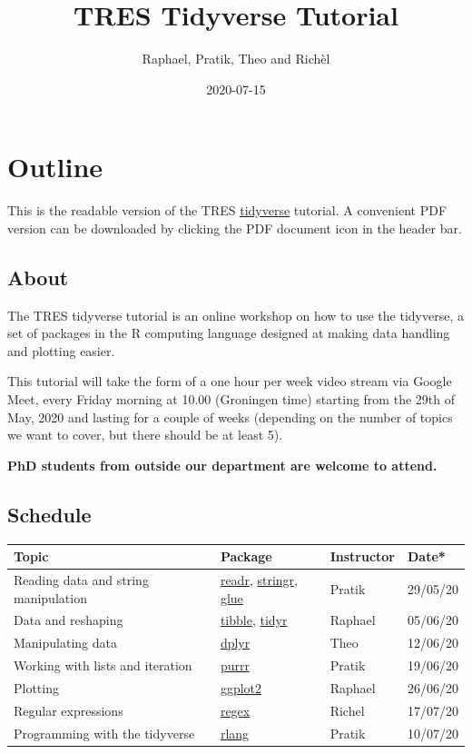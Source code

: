 \documentclass[]{book}
\title{TRES Tidyverse Tutorial}
\author{Raphael, Pratik, Theo and Richèl}
\date{2020-07-15}
\begin{document}
\maketitle


\linenumbers

{
\setcounter{tocdepth}{1}
\tableofcontents
}
\hypertarget{outline}{%
\chapter*{Outline}\label{outline}}

This is the readable version of the TRES \href{https://www.tidyverse.org/}{tidyverse} tutorial. A convenient PDF version can be downloaded by clicking the PDF document icon in the header bar.

\hypertarget{about}{%
\section*{About}\label{about}}

The TRES tidyverse tutorial is an online workshop on how to use the tidyverse, a set of packages in the R computing language designed at making data handling and plotting easier.

This tutorial will take the form of a one hour per week video stream via Google Meet, every Friday morning at 10.00 (Groningen time) starting from the 29th of May, 2020 and lasting for a couple of weeks (depending on the number of topics we want to cover, but there should be at least 5).

\textbf{PhD students from outside our department are welcome to attend.}

\hypertarget{schedule}{%
\section*{Schedule}\label{schedule}}

\begin{longtable}[]{@{}llll@{}}
\toprule
Topic & Package & Instructor & Date*\tabularnewline
\midrule
\endhead
Reading data and string manipulation & \href{https://readr.tidyverse.org/}{readr}, \href{https://stringr.tidyverse.org/}{stringr}, \href{https://github.com/tidyverse/glue}{glue} & Pratik & 29/05/20\tabularnewline
Data and reshaping & \href{https://tibble.tidyverse.org/}{tibble}, \href{https://tidyr.tidyverse.org/}{tidyr} & Raphael & 05/06/20\tabularnewline
Manipulating data & \href{https://dplyr.tidyverse.org/}{dplyr} & Theo & 12/06/20\tabularnewline
Working with lists and iteration & \href{https://purrr.tidyverse.org/}{purrr} & Pratik & 19/06/20\tabularnewline
Plotting & \href{https://ggplot2.tidyverse.org/}{ggplot2} & Raphael & 26/06/20\tabularnewline
Regular expressions & \href{https://stat.ethz.ch/R-manual/R-devel/library/base/html/regex.html}{regex} & Richel & 17/07/20\tabularnewline
Programming with the tidyverse & \href{https://rlang.r-lib.org/}{rlang} & Pratik & 10/07/20\tabularnewline
\bottomrule
\end{longtable}
\end{document}
